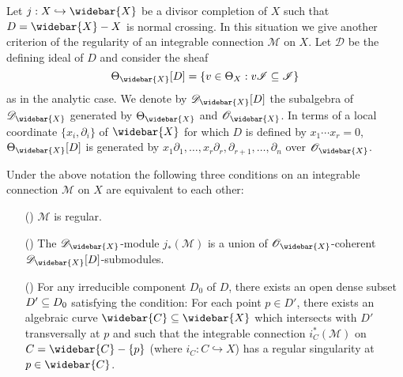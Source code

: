 Let $j:X\hookrightarrow\widebar{X}$ be a divisor completion of $X$ such that $D=\widebar{X}-X$ is normal crossing. In this situation we give another criterion of the regularity of an integrable connection $\mathscr{M}$ on $X$. Let $\mathscr{D}$ be the defining ideal of $D$ and consider the sheaf
\[\Theta_{\widebar{X}}[D]=\{v\in\Theta_X:v\mathscr{I}\sub\mathscr{I}\}\]
as in the analytic case. We denote by $\mathscr{D}_{\widebar{X}}[D]$ the subalgebra of $\mathscr{D}_{\widebar{X}}$ generated by $\Theta_{\widebar{X}}$ and $\mathscr{O}_{\widebar{X}}$. In terms of a local coordinate $\{x_i,\partial_i\}$ of $\widebar{X}$ for which $D$ is defined by $x_1\cdots x_r=0$, $\Theta_{\widebar{X}}[D]$ is generated by $x_1\partial_1,\dots,x_r\partial_r,\partial_{r+1},\dots,\partial_n$ over $\mathscr{O}_{\widebar{X}}$. 

\begin{theorem}\label{D-module algebraic mero conn divisorial NC regular iff}
Under the above notation the following three conditions on an integrable connection $\mathscr{M}$ on $X$ are equivalent to each other:
\begin{enumerate}
    \item[(\rmnum{1})] $\mathscr{M}$ is regular.
    \item[(\rmnum{2})] The $\mathscr{D}_{\widebar{X}}$-module $j_*(\mathscr{M})$ is a union of $\mathscr{O}_{\widebar{X}}$-coherent $\mathscr{D}_{\widebar{X}}[D]$-submodules.
    \item[(\rmnum{3})] For any irreducible component $D_0$ of $D$, there exists an open dense subset $D'\subseteq D_0$ satisfying the condition: For each point $p\in D'$, there exists an algebraic curve $\widebar{C}\sub\widebar{X}$ which intersects with $D'$ transversally at $p$ and such that the integrable connection $i_C^*(\mathscr{M})$ on $C=\widebar{C}-\{p\}$ (where $i_C:C\hookrightarrow X$) has a regular singularity at $p\in\widebar{C}$.
\end{enumerate}
\end{theorem}
